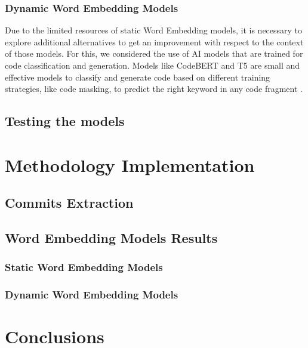 \subsubsection{Dynamic Word Embedding Models}
Due to the limited resources of static Word Embedding models, it is necessary to explore additional alternatives to get an improvement with respect to the context of those models. For this, we considered the use of AI models that are trained for code classification and generation. Models like CodeBERT and T5 are small and effective models to classify and generate code based on different training strategies, like code masking, to predict the right keyword in any code fragment \cite{codebert,t5}.  


\subsection{Testing the models}



\section{Methodology Implementation}


\subsection{Commits Extraction}

\subsection{Word Embedding Models Results}

\subsubsection{Static Word Embedding Models}

\subsubsection{Dynamic Word Embedding Models}



\section{Conclusions}


